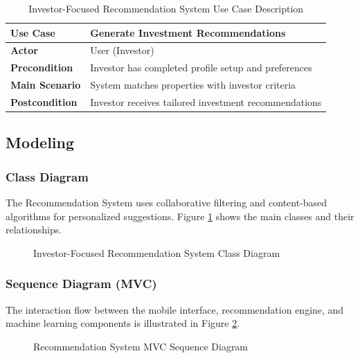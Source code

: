 \begin{table}[htbp]
    \centering
    \begin{tabular}{|p{3cm}|p{10cm}|}
        \hline
        \textbf{Use Case} & \textbf{Generate Investment Recommendations} \\
        \hline
        \textbf{Actor} & User (Investor) \\
        \hline
        \textbf{Precondition} & Investor has completed profile setup and preferences \\
        \hline
        \textbf{Main Scenario} & System matches properties with investor criteria \\
        \hline
        \textbf{Postcondition} & Investor receives tailored investment recommendations \\
        \hline
    \end{tabular}
    \caption{Investor-Focused Recommendation System Use Case Description}
    \label{tab:recommendation-use-case}
\end{table}

\subsection{Modeling}
\subsubsection{Class Diagram}
The Recommendation System uses collaborative filtering and content-based algorithms for personalized suggestions. Figure \ref{fig:recommendation-class-diagram} shows the main classes and their relationships.

\begin{figure}[htbp]
    \centering
    \caption{Investor-Focused Recommendation System Class Diagram}
    \label{fig:recommendation-class-diagram}
\end{figure}

\subsubsection{Sequence Diagram (MVC)}
The interaction flow between the mobile interface, recommendation engine, and machine learning components is illustrated in Figure \ref{fig:recommendation-sequence-mvc}.

\begin{figure}[htbp]
    \centering
    \caption{Recommendation System MVC Sequence Diagram}
    \label{fig:recommendation-sequence-mvc}
\end{figure}

